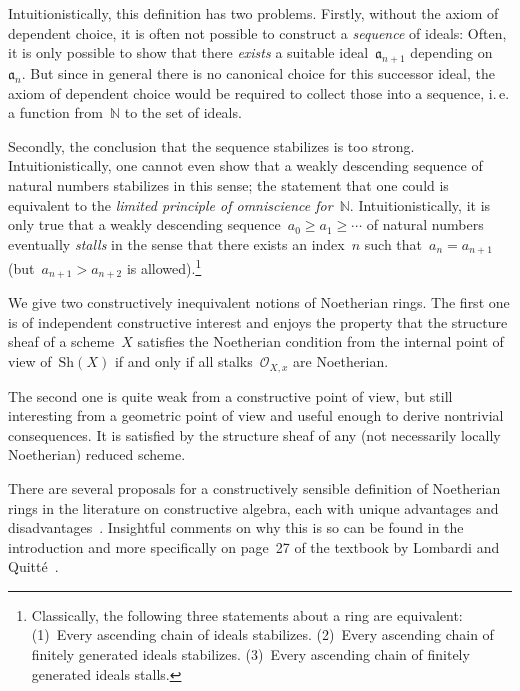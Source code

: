 \documentclass[10pt,reqno,a4paper]{amsbook}
\makeatletter
\theoremstyle{definition}
\theoremstyle{plain}
\theoremstyle{remark}
\renewcommand{\O}{\mathcal{O}}
\newcommand{\NN}{\mathbb{N}}
\newcommand{\aaa}{\mathfrak{a}}
\newcommand{\Sh}{\mathrm{Sh}}
\newcommand{\?}{\,{:}\,}
\renewcommand{\_}{\mathpunct{.}\,}
\newcommand{\ie}{i.\,e.\@\xspace}
\makeatother
\begin{document}
Intuitionistically, this definition has two problems. Firstly, without the
axiom of dependent choice, it is often not possible to construct a
\emph{sequence} of ideals: Often, it is only possible to show that there
\emph{exists} a suitable ideal~$\aaa_{n+1}$ depending on~$\aaa_n$. But since in
general there is no canonical choice for this successor ideal, the axiom of dependent choice
would be required to collect those into a sequence, \ie a function from~$\NN$
to the set of ideals.

Secondly, the conclusion that the sequence stabilizes is too strong.
Intuitionistically, one cannot even show that a weakly descending sequence of
natural numbers stabilizes in this sense; the statement that one could is
equivalent to the \emph{limited principle of omniscience for~$\NN$}.
Intuitionistically, it is only true that a weakly descending sequence~$a_0 \geq
a_1 \geq \cdots$ of natural numbers eventually \emph{stalls} in the sense that
there exists an index~$n$ such that~$a_n = a_{n+1}$ (but~$a_{n+1} > a_{n+2}$ is
allowed).\footnote{Classically, the following three statements about a ring are
equivalent: (1)~Every ascending chain of ideals stabilizes. (2)~Every ascending
chain of finitely generated ideals stabilizes. (3)~Every ascending chain of
finitely generated ideals stalls.}

We give two constructively inequivalent notions of Noetherian rings. The first
one is of independent constructive interest and enjoys the property that the structure sheaf
of a scheme~$X$ satisfies the Noetherian condition from the internal point of
view of~$\Sh(X)$ if and only if all stalks~$\O_{X,x}$ are Noetherian.

The second one is quite weak from a constructive point of view, but still
interesting from a geometric point of view and useful enough to derive
nontrivial consequences. It is satisfied by the structure sheaf of any (not
necessarily locally Noetherian) reduced scheme.

There are several proposals for a constructively sensible definition of
Noetherian rings in the literature on constructive algebra, each with unique
advantages and
disadvantages~\cite{richman:noetherian,mines-richman-ruitenburg:constructive-algebra,perdry:noetherian,perdry:lazy,perdry-schuster:noetherian,tennenbaum:hilbert}.
Insightful comments on why this is so can be found in the introduction and more
specifically on page~27 of the textbook by Lombardi and
Quitté~\cite{lombardi:quitte:constructive-algebra}.
\end{document}
